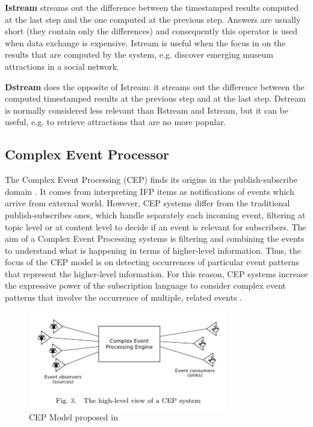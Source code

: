 \textbf{Istream} streams out the difference between the timestamped results computed at the last step and the one computed at the previous step. Answers are usually short (they contain only the differences) and consequently this operator is used when data exchange is expensive. Istream is useful when the focus in on the results that are computed by the system, e.g. discover emerging museum attractions in a social network.

\textbf{Dstream} does the opposite of Istream: it streams out the difference between the computed timestamped results at the previous step and at the last step. Dstream is normally considered less relevant than Rstream and Istream, but it can be useful, e.g. to retrieve attractions that are no more popular.


\subsection{Complex Event Processor}\label{sec:cep}

The Complex Event Processing (CEP)  finds its origins in the publish-subscribe domain \cite{Eugster:2003:MFP:857076.857078}. It comes from interpreting IFP items as notifications of events which arrive from  external world.  However, CEP systems differ from the traditional publish-subscribes ones, which handle separately each incoming event, filtering at topic level or at content level to decide if an event is relevant for subscribers. The aim of a Complex Event Processing systems is filtering and combining the events to understand what is happening in terms of higher-level information. Thus, the focus of the CEP model is on detecting occurrences of particular event patterns that represent the higher-level information. For this reason, CEP systems increase the expressive power of the subscription language to consider complex event patterns that involve the occurrence of multiple, related events \cite{Cugola:2012:PFI:2187671.2187677}.

\begin{figure}[tbh]
  \centering
	\includegraphics[width=0.75\linewidth]{images/cep}
	\caption{CEP Model proposed in \cite{Cugola:2012:PFI:2187671.2187677}  } 
  	\label{fig:cep}
\end{figure}


